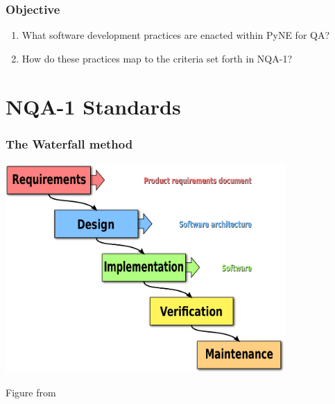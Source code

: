 \documentclass[12pt]{beamer}
\begin{document}
\begin{frame}[fragile]
\frametitle{Objective}

\begin{enumerate}
\item{What software development practices are enacted within PyNE for QA?}
\item{How do these practices map to the criteria set forth in NQA-1?}
\end{enumerate}

\end{frame}

\section{NQA-1 Standards}

\begin{frame}[fragile]
\frametitle{The Waterfall method \cite{waterfall}}
\centerline{\includegraphics[width=0.8\textwidth]{figures/waterfall.pdf}}
Figure from \cite{waterfall_wiki}
\end{frame}
\end{document}
